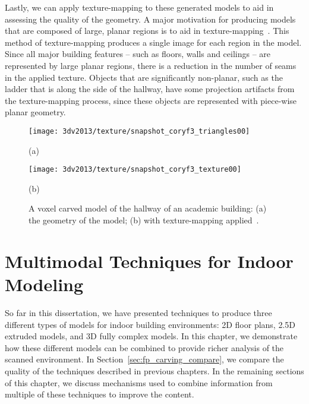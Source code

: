 \documentclass[12pt,onecolumn,oneside]{book}
\begin{document}
Lastly, we can apply texture-mapping to these generated models to aid in assessing the quality of the geometry.  A major motivation for producing models that are composed of large, planar regions is to aid in texture-mapping~\cite{Cheng13}.  This method of texture-mapping produces a single image for each region in the model.  Since all major building features -- such as floors, walls and ceilings -- are represented by large planar regions, there is a reduction in the number of seams in the applied texture.  Objects that are significantly non-planar, such as the ladder that is along the side of the hallway, have some projection artifacts from the texture-mapping process, since these objects are represented with piece-wise planar geometry.

\begin{figure}[t]

	\centering
	\begin{minipage}[b]{0.95\linewidth}
	\centerline{\texttt{[image: 3dv2013/texture/snapshot\_coryf3\_triangles00]}}
	\centerline{(a)}
	\end{minipage}
	\hfill
	\begin{minipage}[b]{0.95\linewidth}
	\centerline{\texttt{[image: 3dv2013/texture/snapshot\_coryf3\_texture00]}}
	\centerline{(b)}
	\end{minipage}

	\caption[Texture-mapping applied to voxel carving result.]{A voxel carved model of the hallway of an academic building: (a) the geometry of the model; (b) with texture-mapping applied~\cite{Cheng13}.}
	\label{fig:3dv2013_bhh_hallway}
\end{figure}


\chapter{Multimodal Techniques for Indoor Modeling}
\label{ch:multimodal_modeling}

So far in this dissertation, we have presented techniques to produce three different types of models for indoor building environments:  2D floor plans, 2.5D extruded models, and 3D fully complex models.  In this chapter, we demonstrate how these different models can be combined to provide richer analysis of the scanned environment.  In Section~\ref{sec:fp_carving_compare}, we compare the quality of the techniques described in previous chapters.  In the remaining sections of this chapter, we discuss mechanisms used to combine information from multiple of these techniques to improve the content.  
\end{document}
